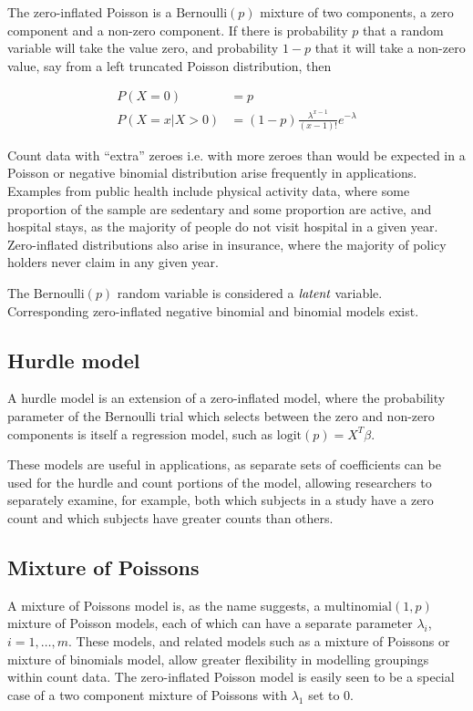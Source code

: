 \documentclass{amsart}
\begin{document}
The zero-inflated Poisson is a $\text{Bernoulli}(p)$ mixture of two components, a zero 
component and a non-zero component. If there is probability $p$ that a random variable 
will take the value zero, and probability $1-p$ that it will take a non-zero value, say 
from a left truncated Poisson distribution, then

\begin{align*}
	P(X=0) &= p\\
	P(X=x|X>0) &= (1-p) \frac{\lambda^{x-1}}{(x-1)!}e^{-\lambda}
\end{align*}

Count data with ``extra'' zeroes i.e. with more zeroes than would be expected in a
Poisson or negative binomial distribution arise frequently in applications. Examples
from public health include physical activity data, where some proportion of the sample
are sedentary and some proportion are active, and hospital stays, as the majority of
people do not visit hospital in a given year. Zero-inflated distributions also arise in
insurance, where the majority of policy holders never claim in any given year.

The $\text{Bernoulli}(p)$ random variable is considered a $\emph{latent}$ variable.
Corresponding zero-inflated negative binomial and binomial models exist.

\subsection{Hurdle model}

A hurdle model is an extension of a zero-inflated model, where the probability parameter
of the Bernoulli trial which selects between the zero and non-zero components is itself
a regression model, such as $\text{logit}(p) = X^T \beta$.

These models are useful in applications, as separate sets of coefficients can be used
for the hurdle and count portions of the model, allowing researchers to separately 
examine, for example, both which subjects in a study have a zero count and which subjects
have greater counts than others.

\subsection{Mixture of Poissons}

A mixture of Poissons model is, as the name suggests, a $\text{multinomial}(1, p)$ mixture
of Poisson models, each of which can have a separate parameter $\lambda_i$,
$i=1, \ldots, m$. These models, and related models such as a mixture of Poissons or
mixture of binomials model, allow greater flexibility in modelling groupings within
count data. The zero-inflated Poisson model is easily seen to be a special case of a
two component mixture of Poissons with $\lambda_1$ set to 0.
\end{document}
